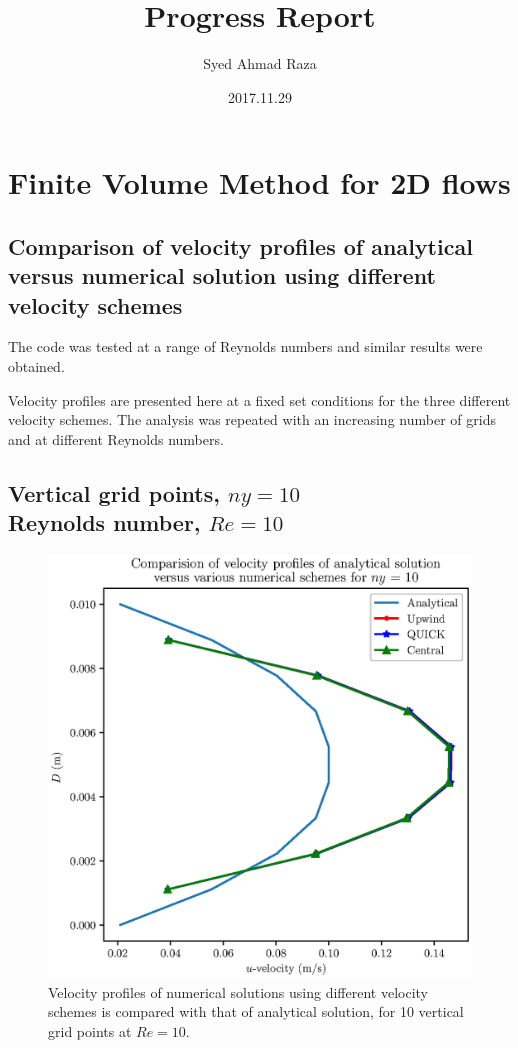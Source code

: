 \documentclass[12pt,a4paper,fleqn]{article}
\title{Progress Report}
\author{Syed Ahmad Raza}
\date{2017.11.29}
\begin{document}
\maketitle
\tableofcontents
\pagebreak

\section{Finite Volume Method for 2D flows}

\subsection{Comparison of velocity profiles of analytical versus numerical solution using different velocity schemes}
The code was tested at a range of Reynolds numbers and similar results were obtained.

Velocity profiles are presented here at a fixed set conditions for the three different velocity schemes. The analysis was repeated with an increasing number of grids and at different Reynolds numbers.

\subsection{Vertical grid points, \(ny=10\)\\
    Reynolds number, \(Re=10\)}

\begin{figure}[H]
    \centering
    \includegraphics[width=\textwidth]{ny-10_profilesComparison.eps}
    \caption{Velocity profiles of numerical solutions using different velocity schemes is compared with that of analytical solution, for 10 vertical grid points at \(Re = 10\).}
    \label{fig:ny-10_profilesComparison}
\end{figure}
\end{document}
